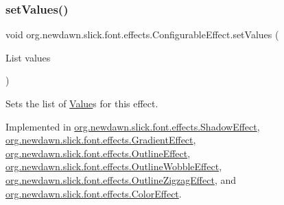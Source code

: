 \mbox{\label{interfaceorg_1_1newdawn_1_1slick_1_1font_1_1effects_1_1_configurable_effect_ac5e1cb43cb0c6b61753616dc746903a2}} 
\subsubsection{\texorpdfstring{set\+Values()}{setValues()}}
{\footnotesize\ttfamily void org.\+newdawn.\+slick.\+font.\+effects.\+Configurable\+Effect.\+set\+Values (\begin{DoxyParamCaption}\item[{List}]{values }\end{DoxyParamCaption})}

Sets the list of \mbox{\hyperlink{interfaceorg_1_1newdawn_1_1slick_1_1font_1_1effects_1_1_configurable_effect_1_1_value}{Value}}s for this effect. 

Implemented in \mbox{\hyperlink{classorg_1_1newdawn_1_1slick_1_1font_1_1effects_1_1_shadow_effect_a448d46d24d5af92c2e7b902545cd2449}{org.\+newdawn.\+slick.\+font.\+effects.\+Shadow\+Effect}}, \mbox{\hyperlink{classorg_1_1newdawn_1_1slick_1_1font_1_1effects_1_1_gradient_effect_a0b5d8084ce260e1c4166078be76a8d6a}{org.\+newdawn.\+slick.\+font.\+effects.\+Gradient\+Effect}}, \mbox{\hyperlink{classorg_1_1newdawn_1_1slick_1_1font_1_1effects_1_1_outline_effect_a02dbe78f6e87a036b850e35d3bbeb17c}{org.\+newdawn.\+slick.\+font.\+effects.\+Outline\+Effect}}, \mbox{\hyperlink{classorg_1_1newdawn_1_1slick_1_1font_1_1effects_1_1_outline_wobble_effect_a7b65a07d67b435d9a5fb18647b6622dd}{org.\+newdawn.\+slick.\+font.\+effects.\+Outline\+Wobble\+Effect}}, \mbox{\hyperlink{classorg_1_1newdawn_1_1slick_1_1font_1_1effects_1_1_outline_zigzag_effect_a9f86c002cb637073d2d5bde424cbd351}{org.\+newdawn.\+slick.\+font.\+effects.\+Outline\+Zigzag\+Effect}}, and \mbox{\hyperlink{classorg_1_1newdawn_1_1slick_1_1font_1_1effects_1_1_color_effect_afe9ec9185b274fed7059b6d74791d089}{org.\+newdawn.\+slick.\+font.\+effects.\+Color\+Effect}}.

